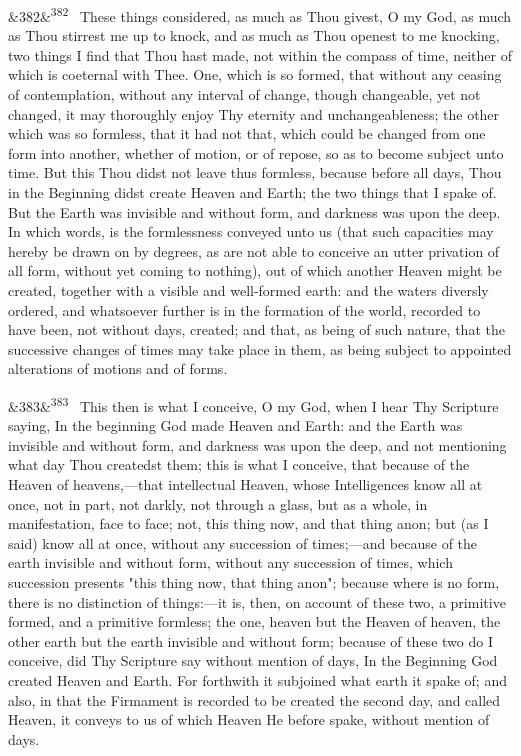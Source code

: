 \documentclass[12pt]{article}
\newcommand{\para}[1][]{\par\noindent\ifx&#1&\else\textsuperscript{\footnotesize #1}~\fi}
\begin{document}
\para[382] These things considered, as much as Thou givest, O my God, as much as Thou stirrest me up to knock, and as much as Thou openest to me knocking, two things I find that Thou hast made, not within the compass of time, neither of which is coeternal with Thee. One, which is so formed, that without any ceasing of contemplation, without any interval of change, though changeable, yet not changed, it may thoroughly enjoy Thy eternity and unchangeableness; the other which was so formless, that it had not that, which could be changed from one form into another, whether of motion, or of repose, so as to become subject unto time. But this Thou didst not leave thus formless, because before all days, Thou in the Beginning didst create Heaven and Earth; the two things that I spake of. But the Earth was invisible and without form, and darkness was upon the deep. In which words, is the formlessness conveyed unto us (that such capacities may hereby be drawn on by degrees, as are not able to conceive an utter privation of all form, without yet coming to nothing), out of which another Heaven might be created, together with a visible and well-formed earth: and the waters diversly ordered, and whatsoever further is in the formation of the world, recorded to have been, not without days, created; and that, as being of such nature, that the successive changes of times may take place in them, as being subject to appointed alterations of motions and of forms.

\para[383] This then is what I conceive, O my God, when I hear Thy Scripture saying, In the beginning God made Heaven and Earth: and the Earth was invisible and without form, and darkness was upon the deep, and not mentioning what day Thou createdst them; this is what I conceive, that because of the Heaven of heavens,---that intellectual Heaven, whose Intelligences know all at once, not in part, not darkly, not through a glass, but as a whole, in manifestation, face to face; not, this thing now, and that thing anon; but (as I said) know all at once, without any succession of times;---and because of the earth invisible and without form, without any succession of times, which succession presents "this thing now, that thing anon"; because where is no form, there is no distinction of things:---it is, then, on account of these two, a primitive formed, and a primitive formless; the one, heaven but the Heaven of heaven, the other earth but the earth invisible and without form; because of these two do I conceive, did Thy Scripture say without mention of days, In the Beginning God created Heaven and Earth. For forthwith it subjoined what earth it spake of; and also, in that the Firmament is recorded to be created the second day, and called Heaven, it conveys to us of which Heaven He before spake, without mention of days.
\end{document}
